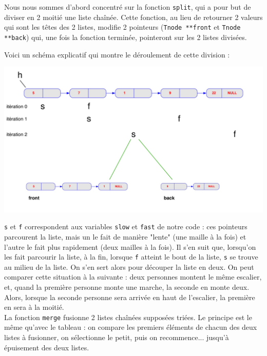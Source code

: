 \documentclass[11pt]{article}
\begin{document}
Nous nous sommes d'abord concentré sur la fonction \texttt{split}, qui a pour but de diviser en 2 moitié une liste chaînée. Cette fonction, au lieu de retourner 2 valeurs qui sont les têtes des 2 listes, modifie 2 pointeurs (\texttt{T\textunderscore node **front} et \texttt{T\textunderscore node **back}) qui, une fois la fonction terminée, pointeront sur les 2 listes divisées.

Voici un schéma explicatif qui montre le déroulement de cette division : 

\begin{center}
\includegraphics[scale=0.25]{images/2.jpg}
\end{center}

\texttt{s} et \texttt{f} correspondent aux variables \texttt{slow} et \texttt{fast} de notre code : ces pointeurs parcourent la liste, mais un le fait de manière "lente" (une maille à la fois) et l'autre le fait plus rapidement (deux mailles à la fois). Il s'en suit que, lorsqu'on les fait parcourir la liste, à la fin, lorsque \texttt{f} atteint le bout de la liste, \texttt{s} se trouve au milieu de la liste. On s'en sert alors pour découper la liste en deux. On peut comparer cette situation à la suivante : deux personnes montent le même escalier, et, quand la première personne monte une marche, la seconde en monte deux. Alors, lorsque la seconde personne sera arrivée en haut de l'escalier, la première en sera à la moitié. \\


La fonction \texttt{merge} fusionne 2 listes chaînées supposées triées. Le principe est le même qu'avec le tableau : on compare les premiers éléments de chacun des deux listes à fusionner, on sélectionne le petit, puis on recommence... jusqu'à épuisement des deux listes. \\
\end{document}
